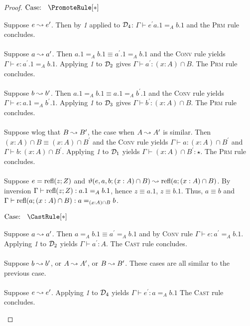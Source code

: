\begin{proof}
    $\text{Case: }\begin{array}{c} \PromoteRule[*] \end{array}$
    \begin{proofcase}
        Suppose $e \leadsto e^\prime$.
        Then by \textit{1} applied to $\mathcal{D}_{4}$: $\Gamma \vdash e^\prime a.1 =_A b.1$ and the \textsc{Prm} rule concludes.
        \\ \\
        Suppose $a \leadsto a^\prime$.
        Then $a.1 =_A b.1 \equiv a^\prime.1 =_A b.1$ and the \textsc{Conv} rule yields $\Gamma \vdash e : a^\prime.1 =_A b.1$.
        Applying \textit{1} to $\mathcal{D}_{2}$ gives $\Gamma \vdash a^\prime : (x : A) \cap B$.
        The \textsc{Prm} rule concludes.
        \\ \\
        Suppose $b \leadsto b^\prime$.
        Then $a.1 =_A b.1 \equiv a.1 =_A b^\prime.1$ and the \textsc{Conv} rule yields $\Gamma \vdash e : a.1 =_A b^\prime.1$.
        Applying \textit{1} to $\mathcal{D}_{3}$ gives $\Gamma \vdash b^\prime : (x : A) \cap B$.
        The \textsc{Prm} rule concludes.
        \\ \\
        Suppose wlog that $B \leadsto B^\prime$, the case when $A \leadsto A^\prime$ is similar.
        Then $(x : A) \cap B \equiv (x : A) \cap B^\prime$ and the \textsc{Conv} rule yields $\Gamma \vdash a : (x : A) \cap B^\prime$ and $\Gamma \vdash b : (x : A) \cap B^\prime$.
        Applying \textit{1} to $\mathcal{D}_{1}$ yields $\Gamma \vdash (x : A) \cap B^\prime : \star$.
        The \textsc{Prm} rule concludes.
        \\ \\
        Suppose $e = \textnormal{refl}(z;Z)$ and $\vartheta(e, a, b; (x:A) \cap B) \leadsto \textnormal{refl}(a; (x : A) \cap B)$.
        By inversion $\Gamma \vdash \textnormal{refl}(z;Z) : a.1 =_A b.1$, hence $z \equiv a.1$, $z \equiv b.1$.
        Thus, $a \equiv b$ and $\Gamma \vdash \textnormal{refl}(a; (x : A) \cap B) : a =_{(x :A) \cap B} b$.
    \end{proofcase}

    $\text{Case: }\begin{array}{c} \CastRule[*] \end{array}$
    \begin{proofcase}
        Suppose $a \leadsto a^\prime$.
        Then $a =_A b.1 \equiv a^\prime =_A b.1$ and by \textsc{Conv} rule $\Gamma \vdash e : a^\prime =_A b.1$.
        Applying \textit{1} to $\mathcal{D}_{2}$ yields $\Gamma \vdash a^\prime : A$.
        The \textsc{Cast} rule concludes.
        \\ \\
        Suppose $b \leadsto b^\prime$, or $A \leadsto A^\prime$, or $B \leadsto B^\prime$.
        These cases are all similar to the previous case.
        \\ \\
        Suppose $e \leadsto e^\prime$.
        Applying \textit{1} to $\mathcal{D}_{4}$ yields $\Gamma \vdash e^\prime : a =_A b.1$
        The \textsc{Cast} rule concludes.
    \end{proofcase}


\end{proof}
